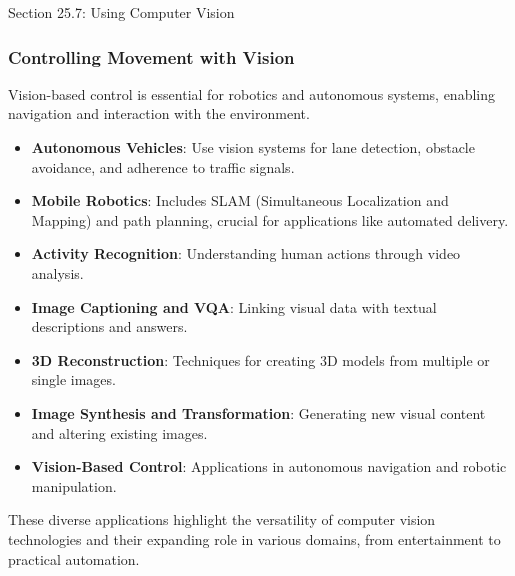 \begin{notes}{Section 25.7: Using Computer Vision}
    \subsubsection*{Controlling Movement with Vision}
    
    Vision-based control is essential for robotics and autonomous systems, enabling navigation and interaction with the environment.
    
    \begin{highlight}
    
        \begin{itemize}
            \item \textbf{Autonomous Vehicles}: Use vision systems for lane detection, obstacle avoidance, and adherence to traffic signals.
            \item \textbf{Mobile Robotics}: Includes SLAM (Simultaneous Localization and Mapping) and path planning, crucial for applications like automated delivery.
        \end{itemize}
    
    \end{highlight}
    
    \begin{highlight}
    
        \begin{itemize}
            \item \textbf{Activity Recognition}: Understanding human actions through video analysis.
            \item \textbf{Image Captioning and VQA}: Linking visual data with textual descriptions and answers.
            \item \textbf{3D Reconstruction}: Techniques for creating 3D models from multiple or single images.
            \item \textbf{Image Synthesis and Transformation}: Generating new visual content and altering existing images.
            \item \textbf{Vision-Based Control}: Applications in autonomous navigation and robotic manipulation.
        \end{itemize}
    
        These diverse applications highlight the versatility of computer vision technologies and their expanding role in various domains, from entertainment to practical automation.
    
    \end{highlight}
\end{notes}